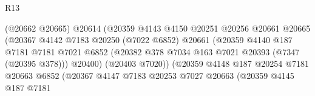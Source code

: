 \begin{lexlean}{R13}
\begin{coremodule}
                                          (@20662 @20665)
                                          @20614
                                          (@20359
                                            @4143
                                            @4150
                                            @20251
                                            @20256
                                            @20661
                                            @20665
                                            (@20367
                                              @4142
                                              @7183
                                              @20250
                                              (@7022 @6852)
                                              @20661
                                              (@20359
                                                @4140
                                                @187
                                                @7181
                                                @7181
                                                @7021
                                                @6852
                                                (@20382
                                                  @378
                                                  @7034
                                                  @163
                                                  @7021
                                                  @20393
                                                  (@7347 (@20395 @378)))
                                                @20400)
                                              (@20403 @7020))
                                            (@20359
                                              @4148
                                              @187
                                              @20254
                                              @7181
                                              @20663
                                              @6852
                                              (@20367
                                                @4147
                                                @7183
                                                @20253
                                                @7027
                                                @20663
                                                (@20359
                                                  @4145
                                                  @187
                                                  @7181

\end{coremodule}
\end{lexlean}
